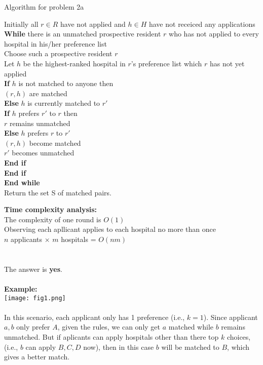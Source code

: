\documentclass[12pt]{article}
\begin{document}
\begin{algorithm}[H]
\caption{Algorithm for problem 2a}
Initially all $r\in R$ have not applied and $h\in H$ have not receiced any applications\\
\textbf{While} there is an unmatched prospective resident $r$ who has not applied to every hospital in his/her preference list\\
\hspace*{10mm}Choose such a prospective resident $r$\\
\hspace*{10mm}Let $h$ be the highest-ranked hospital in $r$'s preference list which $r$ has not yet applied\\
\hspace*{10mm}\textbf{If} $h$ is not matched to anyone then\\
\hspace*{20mm}$(r,h)$ are matched\\
\hspace*{10mm}\textbf{Else} $h$ is currently matched to $r'$\\
\hspace*{20mm}\textbf{If} $h$ prefers $r'$ to $r$ then\\
\hspace*{30mm}$r$ remains unmatched\\
\hspace*{20mm}\textbf{Else} $h$ prefers $r$ to $r'$\\
\hspace*{30mm}$(r,h)$ become matched\\
\hspace*{30mm}$r'$ becomes unmatched\\
\hspace*{20mm}\textbf{End if}\\
\hspace*{10mm}\textbf{End if}\\
\textbf{End while}\\
Return the set S of matched pairs.
\end{algorithm}
\textbf{Time complexity analysis:}\\
The complexity of one round is $O(1)$\\
Observing each apllicant applies to each hospital no more than once\\
$n$ applicants $\times$ $m$ hospitals = $O(nm)$
\section{}
The answer is \textbf{yes}.\\\\
\textbf{Example:}\\
\texttt{[image: fig1.png]} \\\\
In this scenario, each applicant only has 1 preference (i.e., $k=1$). Since applicant $a, b$ only prefer $A$, given the rules, we can only get $a$ matched while $b$ remains unmatched. But if aplicants can apply hospitals other than there top $k$ choices, (i.e., $b$ can apply $B,C,D$ now), then in this case $b$ will be matched to $B$, which gives a better match.
\end{document}
